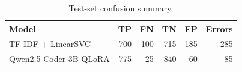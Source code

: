\begin{table}[H]
\centering
\begin{tabular}{lrrrrr}
\toprule
Model & TP & FN & TN & FP & Errors \\
\midrule
TF-IDF + LinearSVC & 700 & 100 & 715 & 185 & 285 \\
Qwen2.5-Coder-3B QLoRA & 775 & 25 & 840 & 60 & 85 \\
\bottomrule
\end{tabular}
\caption{Test-set confusion summary.}
\label{tab:confusion-summary}
\end{table}
